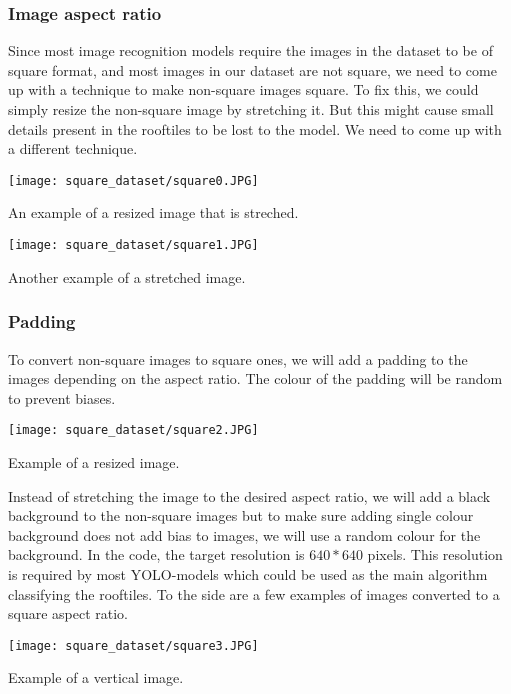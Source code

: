 \subsubsection{Image aspect ratio}
Since most image recognition models require the images in the dataset to be of square format, and most images in our dataset are not square, we need to come up with a technique to make non-square images square. 
To fix this, we could simply resize the non-square image by stretching it. But this might cause small details present in the rooftiles to be lost to the model. We need to come up with a different technique.
\begin{marginfigure} %
	\texttt{[image: square\_dataset/square0.JPG]}
	\caption{An example of a resized image that is streched.}
\end{marginfigure}

\begin{marginfigure} %
	\texttt{[image: square\_dataset/square1.JPG]}
	\caption{Another example of a stretched image.}
\end{marginfigure}

\subsubsection{Padding}
To convert non-square images to square ones, we will add a padding to the images depending on the aspect ratio. The colour of the padding will be random to prevent biases.

\begin{marginfigure} %
	\texttt{[image: square\_dataset/square2.JPG]}
	\caption{Example of a resized image.}
\end{marginfigure}

Instead of stretching the image to the desired aspect ratio, we will add a black background to the non-square images but to make sure adding single colour background does not add bias to images, we will use a random colour for the background. 
In the code, the target resolution is $640*640$ pixels. This resolution is required by most YOLO-models which could be used as the main algorithm classifying the rooftiles. 
To the side are a few examples of images converted to a square aspect ratio.


\begin{marginfigure} %
	\texttt{[image: square\_dataset/square3.JPG]}
	\caption{Example of a vertical image.}
\end{marginfigure}

